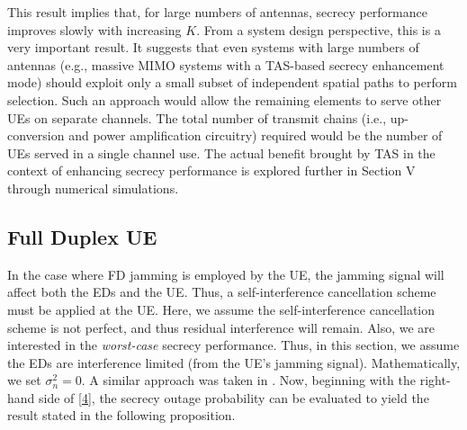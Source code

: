 \documentclass[10pt]{IEEEtran}
\begin{document}
This result implies that, for large numbers of antennas, secrecy performance improves slowly with increasing $K$.  From a system design perspective, this is a very important result. It suggests that even systems with large numbers of antennas (e.g., massive MIMO systems with a TAS-based secrecy enhancement mode) should exploit only a small subset of independent spatial paths to perform selection.  Such an approach would allow the remaining elements to serve other UEs on separate channels.  The total number of transmit chains (i.e., up-conversion and power amplification circuitry) required would be the number of UEs served in a single channel use.  The actual benefit brought by TAS in the context of enhancing secrecy performance is explored further in Section V through numerical simulations.




\subsection{Full Duplex UE}
In the case where FD jamming is employed by the UE, the jamming signal will affect both the EDs and the UE.  Thus, a self-interference cancellation scheme must be applied at the UE.  Here, we assume the self-interference cancellation scheme is not perfect, and thus residual interference will remain.  Also, we are interested in the \emph{worst-case} secrecy performance.  Thus, in this section, we assume the EDs are interference limited (from the UE's jamming signal).  Mathematically, we set $\sigma_n^2 = 0$.  A similar approach was taken in \cite{X.Z13,C.W15,X.Z131}. Now, beginning with the right-hand side of \eqref{4}, the secrecy outage probability can be evaluated to yield the result stated in the following proposition.
\end{document}
